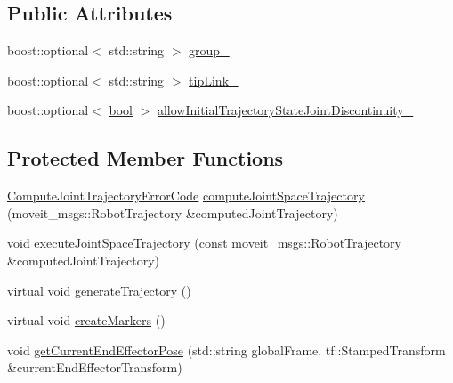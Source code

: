 \subsection*{Public Attributes}
\begin{DoxyCompactItemize}
\item 
boost\+::optional$<$ std\+::string $>$ \hyperlink{classcl__move__group__interface_1_1CbMoveEndEffectorTrajectory_aa247cf74c1d4878bacecba836a839fa7}{group\+\_\+}
\item 
boost\+::optional$<$ std\+::string $>$ \hyperlink{classcl__move__group__interface_1_1CbMoveEndEffectorTrajectory_a24c6c30b9b0761a61fa002d947bd3e11}{tip\+Link\+\_\+}
\item 
boost\+::optional$<$ \hyperlink{classbool}{bool} $>$ \hyperlink{classcl__move__group__interface_1_1CbMoveEndEffectorTrajectory_a01e02533602d045538fd8ccc9a011ea7}{allow\+Initial\+Trajectory\+State\+Joint\+Discontinuity\+\_\+}
\end{DoxyCompactItemize}
\subsection*{Protected Member Functions}
\begin{DoxyCompactItemize}
\item 
\hyperlink{namespacecl__move__group__interface_ae5fc1caf9a16ae5ad1c97c2e137a7017}{Compute\+Joint\+Trajectory\+Error\+Code} \hyperlink{classcl__move__group__interface_1_1CbMoveEndEffectorTrajectory_a485057c052729edd3e8303440b7ada66}{compute\+Joint\+Space\+Trajectory} (moveit\+\_\+msgs\+::\+Robot\+Trajectory \&computed\+Joint\+Trajectory)
\item 
void \hyperlink{classcl__move__group__interface_1_1CbMoveEndEffectorTrajectory_a3a75fa185c62591e1869427650338a32}{execute\+Joint\+Space\+Trajectory} (const moveit\+\_\+msgs\+::\+Robot\+Trajectory \&computed\+Joint\+Trajectory)
\item 
virtual void \hyperlink{classcl__move__group__interface_1_1CbMoveEndEffectorTrajectory_aeae938ab66e18ab7d2fb2427bc83647b}{generate\+Trajectory} ()
\item 
virtual void \hyperlink{classcl__move__group__interface_1_1CbMoveEndEffectorTrajectory_a442efa1d5bc9e9a16f74ecd31b13d9b5}{create\+Markers} ()
\item 
void \hyperlink{classcl__move__group__interface_1_1CbMoveEndEffectorTrajectory_a56945ccfff51e3eb9ec9c2edcfa132af}{get\+Current\+End\+Effector\+Pose} (std\+::string global\+Frame, tf\+::\+Stamped\+Transform \&current\+End\+Effector\+Transform)
\end{DoxyCompactItemize}
